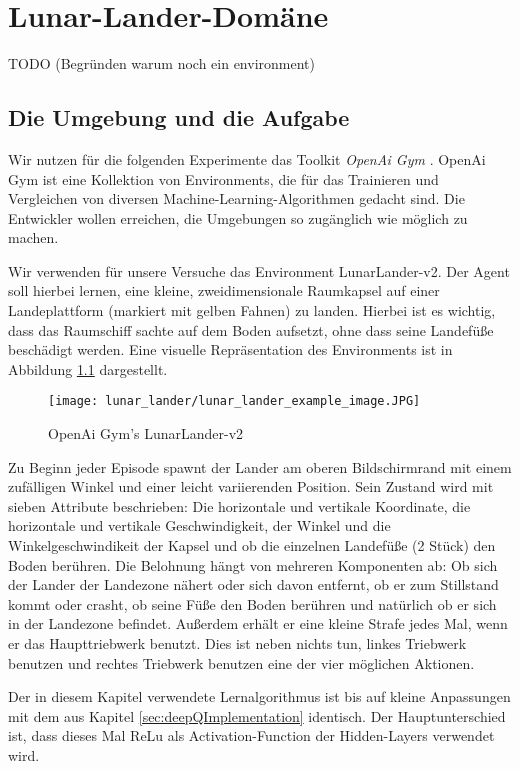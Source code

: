 \chapter{Lunar-Lander-Domäne}\label{sec:LunaLander}
TODO (Begründen warum noch ein environment)

\section{Die Umgebung und die Aufgabe}
Wir nutzen für die folgenden Experimente das Toolkit \textit{OpenAi Gym} \cite{x03_openaiGym}. OpenAi Gym ist eine Kollektion von Environments, die für das Trainieren und Vergleichen von diversen Machine-Learning-Algorithmen gedacht sind. Die Entwickler wollen erreichen, die Umgebungen so zugänglich wie möglich zu machen.

Wir verwenden für unsere Versuche das Environment \glqq LunarLander-v2\grqq{}. Der Agent soll hierbei lernen, eine kleine, zweidimensionale Raumkapsel auf einer Landeplattform (markiert mit gelben Fahnen) zu landen. Hierbei ist es wichtig, dass das Raumschiff sachte auf dem Boden aufsetzt, ohne dass seine Landefüße beschädigt werden. Eine visuelle Repräsentation des Environments ist in Abbildung \ref{img:lunarLanderExample} dargestellt.

\begin{figure}[h!]
    \centering
    \texttt{[image: lunar\_lander/lunar\_lander\_example\_image.JPG]}
    \caption{OpenAi Gym's \glqq LunarLander-v2\grqq{}} \label{img:lunarLanderExample}
\end{figure}

Zu Beginn jeder Episode spawnt der Lander am oberen Bildschirmrand mit einem zufälligen Winkel und einer leicht variierenden Position. Sein Zustand wird mit sieben Attribute beschrieben: Die horizontale und vertikale Koordinate, die horizontale und vertikale Geschwindigkeit, der Winkel und die Winkelgeschwindikeit der Kapsel und ob die einzelnen Landefüße (2 Stück) den Boden berühren. Die Belohnung hängt von mehreren Komponenten ab: Ob sich der Lander der Landezone nähert oder sich davon entfernt, ob er zum Stillstand kommt oder crasht, ob seine Füße den Boden berühren und natürlich ob er sich in der Landezone befindet. Außerdem erhält er eine kleine Strafe jedes Mal, wenn er das Haupttriebwerk benutzt. Dies ist neben nichts tun, linkes Triebwerk benutzen und rechtes Triebwerk benutzen eine der vier möglichen Aktionen.

Der in diesem Kapitel verwendete Lernalgorithmus ist bis auf kleine Anpassungen mit dem aus Kapitel \ref{sec:deepQImplementation} identisch. Der Hauptunterschied ist, dass dieses Mal ReLu als Activation-Function der Hidden-Layers verwendet wird.

